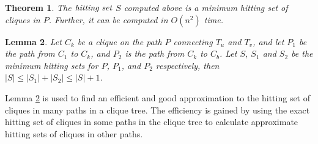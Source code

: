 \documentclass[MS,synopsis]{iitmdiss}
\newtheorem{theorem}{Theorem}
\newtheorem{lemma}[theorem]{Lemma}
\begin{document}
\begin{theorem}\label{hittingset}
 The $\emph{hitting set}$ $S$ computed above is a minimum hitting set of cliques in $P$. Further, it can be computed in $O(n^2)$ time.
\end{theorem}

\begin{lemma}\label{addHS}
 Let $C_k$ be a clique on the path $P$ connecting $T_u$ and $T_v$, and let $P_1$ be the path from $C_1$ to $C_k$, and $P_2$ is the path from $C_k$ to $C_b$.    
 Let $S$, $S_1$ and $S_2$ be the minimum hitting sets for $P$, $ P_1$, and $P_2$ respectively, then $|S| \leq |S_1|+|S_2| \leq |S|+1$. 
 \end{lemma}
 
 
 Lemma \ref{addHS} is used to find an efficient and good approximation to the hitting set of cliques in many paths in a clique tree. 
 The efficiency is gained by using the exact hitting set of cliques in some paths in the clique tree to calculate approximate hitting sets of cliques in other paths.
 
\end{document}

